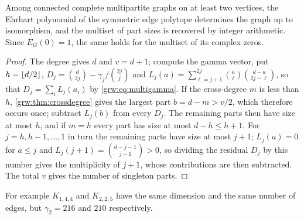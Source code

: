 
\begin{theorem}\label{grw:thm:inverse}
Among connected complete multipartite graphs on at least two vertices, the
Ehrhart polynomial of the symmetric edge polytope determines the graph up
to isomorphism, and the multiset of part sizes is recovered by integer
arithmetic. Since $E_G(0)=1$, the same holds for the multiset of its complex
zeros.
\end{theorem}

\begin{proof}
The degree gives $d$ and $v=d+1$; compute the gamma vector, put
$h=\lfloor d/2\rfloor$, $D_j=\binom d{2j}-\gamma_j/\binom{2j}j$ and
$L_j(a)=\sum_{\ell=j+1}^{2j}\binom a\ell\binom{d-a}{2j-\ell}$, so that
$D_j=\sum_iL_j(a_i)$ by \eqref{grw:eq:multigamma}. If the cross-degree $m$ is
less than $h$, \cref{grw:thm:crossdegree} gives the largest part $b=d-m>v/2$,
which therefore occurs once; subtract $L_j(b)$ from every $D_j$. The
remaining parts then have size at most $h$, and if $m=h$ every part has size
at most $d-h\le h+1$. For $j=h,h-1,\dots,1$ in turn the remaining parts have
size at most $j+1$; $L_j(a)=0$ for $a\le j$ and
$L_j(j+1)=\binom{d-j-1}{j-1}>0$, so dividing the residual $D_j$ by this number
gives the multiplicity of $j+1$, whose contributions are then subtracted. The
total $v$ gives the number of singleton parts.
\end{proof}

For example $K_{1,4,4}$ and $K_{2,2,5}$ have the same dimension and the same
number of edges, but $\gamma_2=216$ and $210$ respectively.

